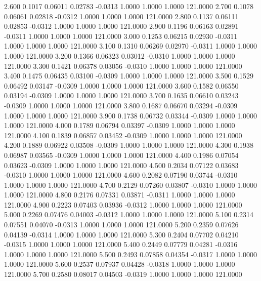    2.600   0.1017   0.06011   0.02783  -0.0313   1.0000   1.0000   1.0000 121.0000
   2.700   0.1078   0.06061   0.02818  -0.0312   1.0000   1.0000   1.0000 121.0000
   2.800   0.1137   0.06111   0.02853  -0.0312   1.0000   1.0000   1.0000 121.0000
   2.900   0.1196   0.06163   0.02891  -0.0311   1.0000   1.0000   1.0000 121.0000
   3.000   0.1253   0.06215   0.02930  -0.0311   1.0000   1.0000   1.0000 121.0000
   3.100   0.1310   0.06269   0.02970  -0.0311   1.0000   1.0000   1.0000 121.0000
   3.200   0.1366   0.06323   0.03012  -0.0310   1.0000   1.0000   1.0000 121.0000
   3.300   0.1421   0.06378   0.03056  -0.0310   1.0000   1.0000   1.0000 121.0000
   3.400   0.1475   0.06435   0.03100  -0.0309   1.0000   1.0000   1.0000 121.0000
   3.500   0.1529   0.06492   0.03147  -0.0309   1.0000   1.0000   1.0000 121.0000
   3.600   0.1582   0.06550   0.03194  -0.0309   1.0000   1.0000   1.0000 121.0000
   3.700   0.1635   0.06610   0.03243  -0.0309   1.0000   1.0000   1.0000 121.0000
   3.800   0.1687   0.06670   0.03294  -0.0309   1.0000   1.0000   1.0000 121.0000
   3.900   0.1738   0.06732   0.03344  -0.0309   1.0000   1.0000   1.0000 121.0000
   4.000   0.1789   0.06794   0.03397  -0.0309   1.0000   1.0000   1.0000 121.0000
   4.100   0.1839   0.06857   0.03452  -0.0309   1.0000   1.0000   1.0000 121.0000
   4.200   0.1889   0.06922   0.03508  -0.0309   1.0000   1.0000   1.0000 121.0000
   4.300   0.1938   0.06987   0.03565  -0.0309   1.0000   1.0000   1.0000 121.0000
   4.400   0.1986   0.07054   0.03623  -0.0309   1.0000   1.0000   1.0000 121.0000
   4.500   0.2034   0.07122   0.03683  -0.0310   1.0000   1.0000   1.0000 121.0000
   4.600   0.2082   0.07190   0.03744  -0.0310   1.0000   1.0000   1.0000 121.0000
   4.700   0.2129   0.07260   0.03807  -0.0310   1.0000   1.0000   1.0000 121.0000
   4.800   0.2176   0.07331   0.03871  -0.0311   1.0000   1.0000   1.0000 121.0000
   4.900   0.2223   0.07403   0.03936  -0.0312   1.0000   1.0000   1.0000 121.0000
   5.000   0.2269   0.07476   0.04003  -0.0312   1.0000   1.0000   1.0000 121.0000
   5.100   0.2314   0.07551   0.04070  -0.0313   1.0000   1.0000   1.0000 121.0000
   5.200   0.2359   0.07626   0.04139  -0.0314   1.0000   1.0000   1.0000 121.0000
   5.300   0.2404   0.07702   0.04210  -0.0315   1.0000   1.0000   1.0000 121.0000
   5.400   0.2449   0.07779   0.04281  -0.0316   1.0000   1.0000   1.0000 121.0000
   5.500   0.2493   0.07858   0.04354  -0.0317   1.0000   1.0000   1.0000 121.0000
   5.600   0.2537   0.07937   0.04428  -0.0318   1.0000   1.0000   1.0000 121.0000
   5.700   0.2580   0.08017   0.04503  -0.0319   1.0000   1.0000   1.0000 121.0000
